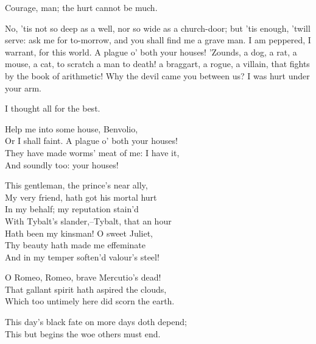 \begin{speech}
Courage, man; the hurt cannot be much. \\
\end{speech}
\begin{speech}
No, 'tis not so deep as a well, nor so
wide as a church-door; but 'tis enough, 'twill
serve: ask me for to-morrow, and you shall
find me a grave man. I am peppered, I warrant,
for this world. A plague o' both your
houses! 'Zounds, a dog, a rat, a mouse, a cat,
to scratch a man to death! a braggart, a
rogue, a villain, that fights by the book of
arithmetic! Why the devil came you between
us? I was hurt under your arm.
\end{speech}
\begin{speech}
I thought all for the best.
\end{speech}
\begin{speech}
Help me into some house, Benvolio, \\
Or I shall faint. A plague o' both your houses! \\
They have made worms' meat of me: I have it, \\
And soundly too: your houses! 
\\
\end{speech}
\begin{speech}
This gentleman, the prince's near ally, \\
My very friend, hath got his mortal hurt \\
In my behalf; my reputation stain'd \\
With Tybalt's slander,--Tybalt, that an hour \\
Hath been my kinsman! O sweet Juliet, \\
Thy beauty hath made me effeminate \\
And in my temper soften'd valour's steel! 
\\
\end{speech}
\begin{speech}
O Romeo, Romeo, brave Mercutio's dead! \\
That gallant spirit hath aspired the clouds, \\
Which too untimely here did scorn the earth. \\
\end{speech}
\begin{speech}
This day's black fate on more days doth depend; \\

This but begins the woe others must end. \\
\end{speech}
